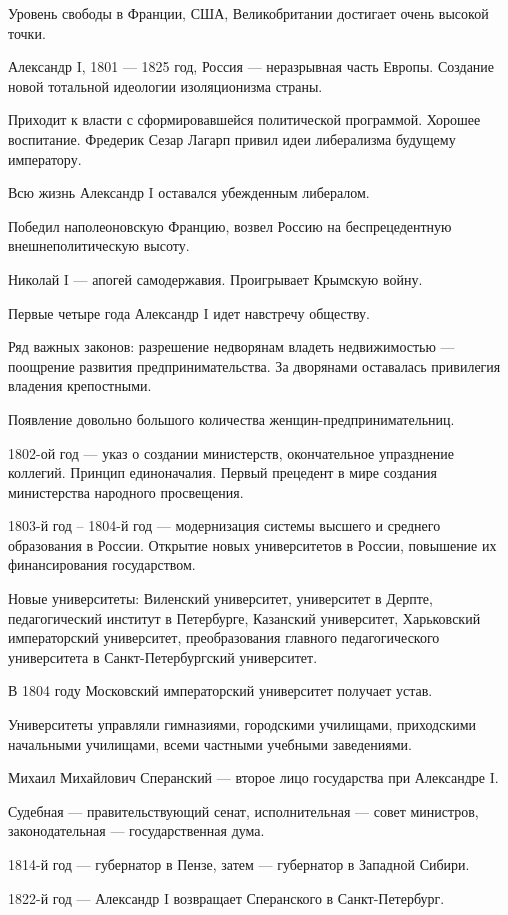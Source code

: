\documentclass{article}
\begin{document}
Уровень свободы в Франции, США, Великобритании достигает очень высокой точки.

\hfill

Александр I, 1801 — 1825 год, Россия — неразрывная часть Европы. Создание новой тотальной идеологии изоляционизма страны.

Приходит к власти с сформировавшейся политической программой. Хорошее воспитание. Фредерик Сезар Лагарп привил идеи либерализма будущему императору.

Всю жизнь Александр I оставался убежденным либералом.

Победил наполеоновскую Францию, возвел Россию на беспрецедентную внешнеполитическую высоту.

\hfill

Николай I — апогей самодержавия. Проигрывает Крымскую войну.

\hfill

Первые четыре года Александр I идет навстречу обществу.

Ряд важных законов: разрешение недворянам владеть недвижимостью — поощрение развития предпринимательства. За дворянами оставалась привилегия владения крепостными.

Появление довольно большого количества женщин-предпринимательниц.

1802-ой год — указ о создании министерств, окончательное упразднение коллегий. Принцип единоначалия. Первый прецедент в мире создания министерства народного просвещения.

1803-й год – 1804-й год — модернизация системы высшего и среднего образования в России. Открытие новых университетов в России, повышение их финансирования государством.

Новые университеты: Виленский университет, университет в Дерпте, педагогический институт в Петербурге, Казанский университет, Харьковский императорский университет, преобразования главного педагогического университета в Санкт-Петербургский университет.

В 1804 году Московский императорский университет получает устав.

Университеты управляли гимназиями, городскими училищами, приходскими начальными училищами, всеми частными учебными заведениями.

\hfill

Михаил Михайлович Сперанский — второе лицо государства при Александре I.

Судебная — правительствующий сенат, исполнительная — совет министров, законодательная — государственная дума.

1814-й год — губернатор в Пензе, затем — губернатор в Западной Сибири.

1822-й год — Александр I возвращает Сперанского в Санкт-Петербург.
\end{document}
